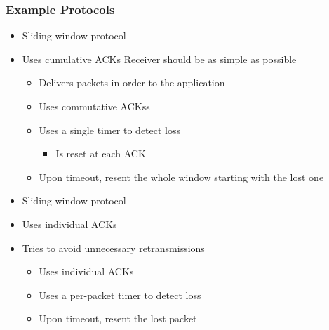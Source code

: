 \subsubsection{Example Protocols}
\begin{itemize}
        \begin{itemize}
            \item Sliding window protocol
            \item Uses cumulative ACKs
             Receiver should be as simple as possible
                \begin{itemize}
                    \item Delivers packets in-order to the application
                    \item Uses commutative ACKss
                \end{itemize}
                \begin{itemize}
                    \item Uses a single timer to detect loss
                        \begin{itemize}
                            \item Is reset at each ACK
                        \end{itemize}
                    \item Upon timeout, resent the whole window starting with the lost one
                \end{itemize}
        \end{itemize}
        \begin{itemize}
            \item Sliding window protocol
            \item Uses individual ACKs
            \item Tries to avoid unnecessary retransmissions
                \begin{itemize}
                    \item Uses individual ACKs
                \end{itemize}
                \begin{itemize}
                    \item Uses a per-packet timer to detect loss
                    \item Upon timeout, resent the lost packet
                \end{itemize}
        \end{itemize}
\end{itemize}

